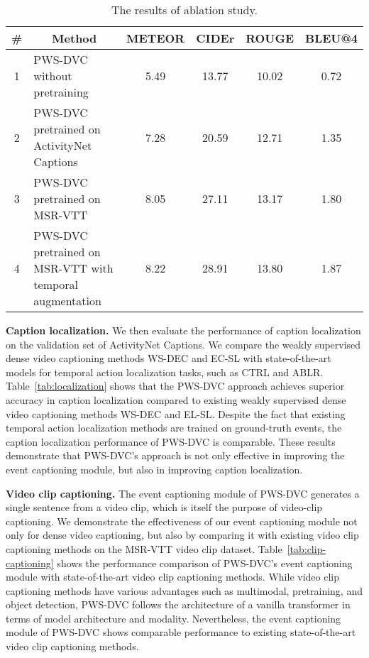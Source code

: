 \begin{sidewaystable}
    \centering
    \begin{tabular}{c|l|cccc}
        \hline
        \# & \multicolumn{1}{c|}{Method}                              & METEOR & CIDEr & ROUGE & BLEU@4 \\ \hline
        1  & PWS-DVC without pretraining                              & 5.49   & 13.77 & 10.02 & 0.72   \\
        2  & PWS-DVC pretrained on ActivityNet Captions               & 7.28   & 20.59 & 12.71 & 1.35   \\
        3  & PWS-DVC pretrained on MSR-VTT                            & 8.05   & 27.11 & 13.17 & 1.80   \\ \hline
        4  & PWS-DVC pretrained on MSR-VTT with temporal augmentation & 8.22   & 28.91 & 13.80 & 1.87   \\ \hline
    \end{tabular}
    \caption{The results of ablation study.}
    \label{tab:ablation}
\end{sidewaystable}

\textbf{Caption localization.}
We then evaluate the performance of caption localization on the validation set of ActivityNet Captions.
We compare the weakly supervised dense video captioning methods WS-DEC and EC-SL with state-of-the-art models for temporal action localization tasks, such as CTRL and ABLR.
Table~\ref{tab:localization} shows that the PWS-DVC approach achieves superior accuracy in caption localization compared to existing weakly supervised dense video captioning methods WS-DEC and EL-SL.
Despite the fact that existing temporal action localization methods are trained on ground-truth events, the caption localization performance of PWS-DVC is comparable.
These results demonstrate that PWS-DVC's approach is not only effective in improving the event captioning module, but also in improving caption localization.

\textbf{Video clip captioning.}
The event captioning module of PWS-DVC generates a single sentence from a video clip, which is itself the purpose of video-clip captioning.
We demonstrate the effectiveness of our event captioning module not only for dense video captioning, but also by comparing it with existing video clip captioning methods on the MSR-VTT video clip dataset.
Table~\ref{tab:clip-captioning} shows the performance comparison of PWS-DVC's event captioning module with state-of-the-art video clip captioning methods.
While video clip captioning methods have various advantages such as multimodal, pretraining, and object detection, PWS-DVC follows the architecture of a vanilla transformer in terms of model architecture and modality.
Nevertheless, the event captioning module of PWS-DVC shows comparable performance to existing state-of-the-art video clip captioning methods.

